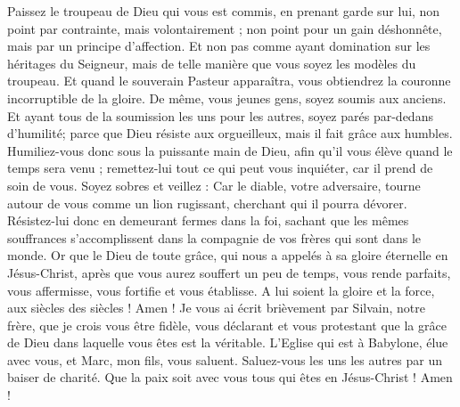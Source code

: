 \begin{multicols}{2}
Paissez le troupeau de Dieu qui vous est commis, en prenant garde sur lui, non point par contrainte, mais volontairement ; non point pour un gain déshonnête, mais par un principe d'affection. 
Et non pas comme ayant domination sur les héritages du Seigneur, mais de telle manière que vous soyez les modèles du troupeau. 
Et quand le souverain Pasteur apparaîtra, vous obtiendrez la couronne incorruptible de la gloire.
De même, vous jeunes gens, soyez soumis aux anciens. Et ayant tous de la soumission les uns pour les autres, soyez parés par-dedans d'humilité; parce que Dieu résiste aux orgueilleux, mais il fait grâce aux humbles. 
Humiliez-vous donc sous la puissante main de Dieu, afin qu'il vous élève quand le temps sera venu ;
remettez-lui tout ce qui peut vous inquiéter, car il prend de soin de vous.
Soyez sobres et veillez : Car le diable, votre adversaire, tourne autour de vous comme un lion rugissant, cherchant qui il pourra dévorer. 
Résistez-lui donc en demeurant fermes dans la foi, sachant que les mêmes souffrances s'accomplissent dans la compagnie de vos frères qui sont dans le monde. 
Or que le Dieu de toute grâce, qui nous a appelés à sa gloire éternelle en Jésus-Christ, après que vous aurez souffert un peu de temps, vous rende parfaits, vous affermisse, vous fortifie et vous établisse. 
A lui soient la gloire et la force, aux siècles des siècles ! Amen !
Je vous ai écrit brièvement par Silvain, notre frère, que je crois vous être fidèle, vous déclarant et vous protestant que la grâce de Dieu dans laquelle vous êtes est la véritable. 
L'Eglise qui est à Babylone, élue avec vous, et Marc, mon fils, vous saluent. 
Saluez-vous les uns les autres par un baiser de charité. Que la paix soit avec vous tous qui êtes en Jésus-Christ ! Amen !
\PPE{}
\end{multicols}
